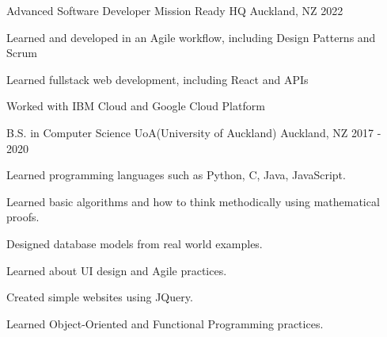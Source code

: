 

\begin{cventries}


  \cventry
    {Advanced Software Developer}
    {Mission Ready HQ}
    {Auckland, NZ}
    {2022}
    {
      \begin{cvitems}
        \item {Learned and developed in an Agile workflow, including Design Patterns and Scrum}
        \item {Learned fullstack web development, including React and APIs}
        \item {Worked with IBM Cloud and Google Cloud Platform}
      \end{cvitems}
    }

  \cventry
    {B.S. in Computer Science} %
    {UoA(University of Auckland)} %
    {Auckland, NZ} %
    {2017 - 2020} %
    {
      \begin{cvitems} %
        \item {Learned programming languages such as Python, C, Java, JavaScript.}
        \item {Learned basic algorithms and how to think methodically using mathematical proofs.}
        \item {Designed database models from real world examples.}
        \item {Learned about UI design and Agile practices.}
        \item {Created simple websites using JQuery.}
        \item {Learned Object-Oriented and Functional Programming practices.}
      \end{cvitems}
    }

\end{cventries}
